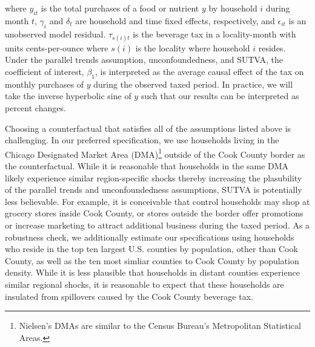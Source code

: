 \documentclass[12pt]{article}
\begin{document}
where $y_{it}$ is the total purchases of a food or nutrient $y$ by household $i$ during month $t$, $\gamma_i$ and $\delta_t$ are household and time fixed effects, respectively, and $\epsilon_{it}$ is an unobserved model residual. $\tau_{s(i)t}$ is the beverage tax in a locality-month with units cents-per-ounce where $s(i)$ is the locality where household $i$ resides. Under the parallel trends assumption, unconfoundedness, and SUTVA, the coefficient of interest, $\beta_1$, is interpreted as the average causal effect of the tax on monthly purchases of $y$ during the observed taxed period. In practice, we will take the inverse hyperbolic sine of $y$ such that our results can be interpreted as percent changes.

Choosing a counterfactual that satisfies all of the assumptions listed above is challenging. In our preferred specification, we use households living in the Chicago Designated Market Area (DMA)\footnote{Nielsen's DMAs are similar to the Census Bureau's Metropolitan Statistical Areas.} outside of the Cook County border as the counterfactual. While it is reasonable that households in the same DMA likely experience similar region-specific shocks thereby increasing the plasubility of the parallel trends and unconfoundedness assumptions, SUTVA is potentially less believable. For example, it is conceivable that control households may shop at grocery stores inside Cook County, or stores outside the border offer promotions or increase marketing to attract additional business during the taxed period. As a robustness check, we additionally estimate our specifications using households who reside in the top ten largest U.S. counties by population, other than Cook County, as well as the ten most simliar counties to Cook County by population density. While it is less plausible that households in distant counties experience similar regional shocks, it is reasonable to expect that these households are insulated from spillovers caused by the Cook County beverage tax.

\end{document}
